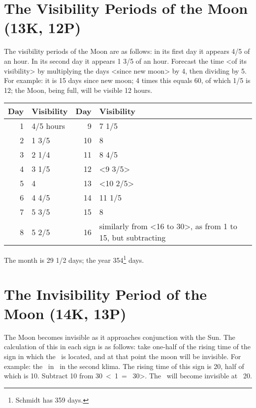 \section{The Visibility Periods of the Moon (13K, 12P)}
The visibility periods of the Moon are as follows: in its first day it appears 4/5 of an hour. In its second day it appears 1 3/5 of an hour. Forecast the time <of its visibility> by multiplying the days <since new moon> by 4, then dividing by 5. For example: it is 15 days since new moon; 4 times this equals 60, of which 1/5 is 12; the Moon, being full, will be visible 12 hours.

\begin{table}[ht]
\begin{center}
\begin{tabularx}{\textwidth}	{| r | l | r | X |}
\hline
Day & Visibility & Day & Visibility \\
\hline
1	& 4/5 hours	& 9		& 7 1/5	\\
2	& 1 3/5	  	& 10	& 8			\\	
3	& 2 1/4		& 11	& 8 4/5	\\
4	& 3 1/5		& 12	& <9 3/5>	\\
5	& 4				& 13	& <10 2/5> \\
6	& 4 4/5		& 14	& 11 1/5	\\
7	& 5 3/5		& 15 	& 8			\\
8	& 5 2/5		& 16	& similarly from <16 to 30>, as
							  from 1 to 15, but subtracting \\				\hline
\end{tabularx}
\end{center}
\end{table}

The month is 29 1/2 days; the year 354\footnote{Schmidt has 359 days.} days.

\newpage
\section{The Invisibility Period of the Moon (14K, 13P)}
The Moon becomes invisible as it approaches conjunction with the Sun. The calculation of this in each sign is as follows: take one-half of the rising time of the sign in which the \Sun\, is located, and at that point the moon will be invisible. For example: the \Sun\, in \Aries\, in the second klima. The rising time of this sign is 20, half of which is 10. Subtract 10 from 30\deg\, <\Aries\, 1\deg\, = \Pisces\, 30\deg>. The \Moon\, will become invisible at \Pisces\, 20\deg.

